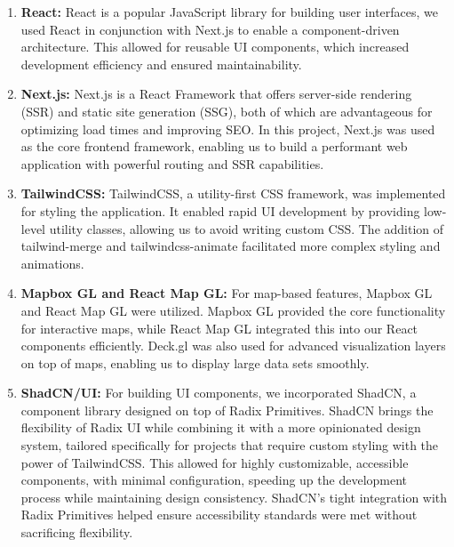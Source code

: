 \vspace{-3mm}
\begin{enumerate}
    \item{\textbf{React:} React is a popular JavaScript library for building
    user interfaces, we used React in conjunction with Next.js to enable a
    component-driven architecture. This allowed for reusable UI components,
    which increased development efficiency and ensured maintainability.}
    \vspace{1.25mm}

    \item{\textbf{Next.js:} Next.js is a React Framework that offers server-side
    rendering (SSR) and static site generation (SSG), both of which are
    advantageous for optimizing load times and improving SEO. In this project,
    Next.js was used as the core frontend framework, enabling us to build a
    performant web application with powerful routing and SSR capabilities.}
    \vspace{1.25mm}

    \item{\textbf{TailwindCSS:} TailwindCSS, a utility-first CSS framework, was
    implemented for styling the application. It enabled rapid UI development by
    providing low-level utility classes, allowing us to avoid writing custom
    CSS. The addition of tailwind-merge and tailwindcss-animate facilitated more
    complex styling and animations.}
    \vspace{1.25mm}

    \pagebreak{}

    \item{\textbf{Mapbox GL and React Map GL:} For map-based features, Mapbox GL
    and React Map GL were utilized. Mapbox GL provided the core functionality
    for interactive maps, while React Map GL integrated this into our React
    components efficiently. Deck.gl was also used for advanced visualization
    layers on top of maps, enabling us to display large data sets smoothly.}
    \vspace{1.25mm}

    \item{\textbf{ShadCN/UI:} For building UI components, we incorporated
    ShadCN, a component library designed on top of Radix Primitives. ShadCN
    brings the flexibility of Radix UI while combining it with a more
    opinionated design system, tailored specifically for projects that require
    custom styling with the power of TailwindCSS. This allowed for highly
    customizable, accessible components, with minimal configuration, speeding up
    the development process while maintaining design consistency. ShadCN’s tight
    integration with Radix Primitives helped ensure accessibility standards were
    met without sacrificing flexibility.}
    \vspace{1.25mm}

\end{enumerate}

